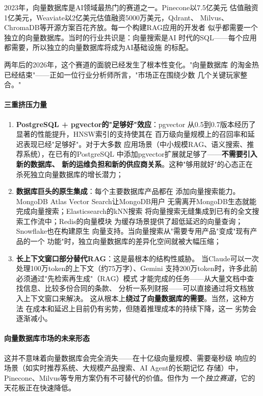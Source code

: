 2023年，向量数据库是AI领域最热门的赛道之一。Pinecone以7.5亿美元
估值融资1亿美元，Weaviate以2亿美元估值融资5000万美元，Qdrant、
Milvus、ChromaDB等开源方案百花齐放。每一个构建RAG应用的开发者
似乎都需要一个独立的向量数据库。当时的行业共识是：向量搜索是AI
时代的SQL——每个应用都需要，所以独立的向量数据库将成为AI基础设施
的标配。

两年后的2026年，这个赛道的面貌已经发生了根本性变化。"向量数据库
的淘金热已经结束"——正如一位行业分析师所言，"市场正在围绕少数
几个关键玩家整合。"

\paragraph{三重挤压力量}

\begin{enumerate}
  \item \textbf{PostgreSQL + pgvector的"足够好"效应}：pgvector
    从0.5到0.7版本经历了显著的性能提升，HNSW索引的支持使其在
    百万级向量规模上的召回率和延迟表现已经"足够好"。对于大多数
    应用场景（中小规模RAG、语义搜索、推荐系统），在已有的PostgreSQL
    中添加pgvector扩展就足够了——\textbf{不需要引入新的数据库、
    新的运维负担和新的供应商关系}。这种"够用就好"的心态正在
    杀死独立向量数据库的增长潜力；

  \item \textbf{数据库巨头的原生集成}：每个主要数据库产品都在
    添加向量搜索能力。MongoDB Atlas Vector Search让MongoDB用户
    无需离开MongoDB生态就能完成向量搜索；Elasticsearch的kNN搜索
    将向量搜索无缝集成到已有的全文搜索工作流中；Redis的向量模块
    为缓存场景提供了超低延迟的向量查询；Snowflake也在构建原生
    向量支持。当向量搜索从"需要专用产品"变成"现有产品的一个
    功能"时，独立向量数据库的差异化空间就被大幅压缩；

  \item \textbf{长上下文窗口部分替代RAG}：这是最根本的结构性威胁。
    当Claude可以一次处理100万token的上下文（约75万字）、Gemini
    支持200万token时，许多此前必须通过"先检索再生成"（RAG）模式
    才能完成的任务——从大量文档中查找信息、比较多份合同的条款、
    分析一系列财报——可以直接通过将文档放入上下文窗口来解决。
    这从根本上\textbf{绕过了向量数据库的需要}。当然，这种方法
    在成本和延迟上目前仍有劣势，但随着推理成本的持续下降，这一
    劣势会逐渐减小。
\end{enumerate}

\paragraph{向量数据库市场的未来形态}
这并不意味着向量数据库会完全消失——在十亿级向量规模、需要毫秒级
响应的场景（如实时推荐系统、大规模产品搜索、AI Agent的长期记忆
存储）中，Pinecone、Milvus等专用方案仍有不可替代的价值。但作为
一个\emph{独立赛道}，它的天花板正在快速降低。

